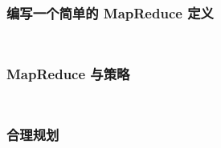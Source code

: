 \documentclass[./main.tex]{subfiles}
\begin{document}
\begin{lstlisting}[language=Haskell]

\end{lstlisting}



\begin{lstlisting}[language=Haskell]

\end{lstlisting}



\begin{lstlisting}[language=Haskell]

\end{lstlisting}



\begin{lstlisting}[language=Haskell]

\end{lstlisting}

\subsubsection*{编写一个简单的 MapReduce 定义}

%

\begin{lstlisting}[language=Haskell]

\end{lstlisting}



\begin{lstlisting}[language=Haskell]

\end{lstlisting}

\subsubsection*{MapReduce 与策略}

%

\begin{lstlisting}[language=Haskell]

\end{lstlisting}



\begin{lstlisting}[language=Haskell]

\end{lstlisting}

\subsubsection*{合理规划}
\end{document}
